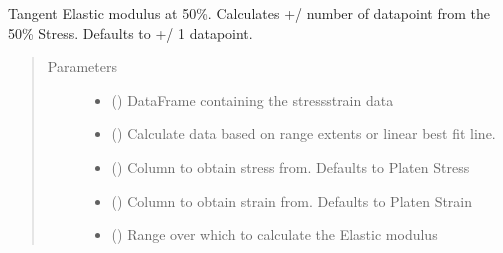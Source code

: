 \documentclass[letterpaper,10pt,english]{sphinxmanual}
\begin{document}
\begin{fulllineitems}

\begin{fulllineitems}
\label{\detokenize{openfdem:openfdem.openfdem.Model.Etan50_mod}}
Tangent Elastic modulus at 50\%. Calculates +/\sphinxhyphen{} number of datapoint from the 50\% Stress. Defaults to +/\sphinxhyphen{} 1 datapoint.
\begin{quote}\begin{description}
\item[{Parameters}] \leavevmode\begin{itemize}
\item {} 
 () \textendash{} DataFrame containing the stress\sphinxhyphen{}strain data

\item {} 
 () \textendash{} Calculate data based on range extents or linear best fit line.

\item {} 
 () \textendash{} Column to obtain stress from. Defaults to Platen Stress

\item {} 
 () \textendash{} Column to obtain strain from. Defaults to Platen Strain

\item {} 
 () \textendash{} Range over which to calculate the Elastic modulus

\end{itemize}


\end{description}
\end{quote}
\end{fulllineitems}
\end{fulllineitems}
\end{document}
